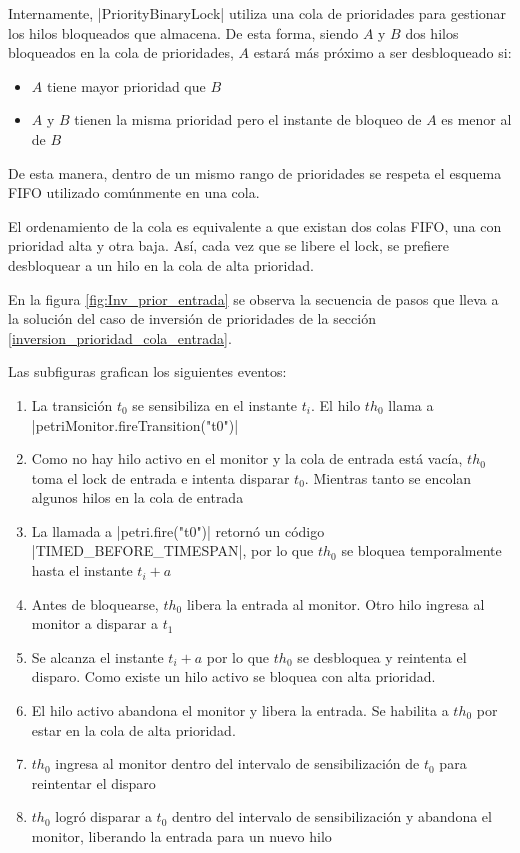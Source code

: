 Internamente, |PriorityBinaryLock| utiliza una cola de prioridades
para gestionar los hilos bloqueados que almacena. De esta forma, siendo $A$ y $B$
dos hilos bloqueados en la cola de prioridades, $A$ estará más próximo a ser
desbloqueado si:
\begin{itemize}
  \item $A$ tiene mayor prioridad que $B$
  \item $A$ y $B$ tienen la misma prioridad pero el instante de bloqueo de $A$
  es menor al de $B$
\end{itemize}

De esta manera, dentro de un mismo rango de prioridades se respeta el esquema
FIFO utilizado comúnmente en una cola.

El ordenamiento de la cola es equivalente a que existan dos colas FIFO, una con
prioridad alta y otra baja. Así, cada vez que se libere el lock, se prefiere
desbloquear a un hilo en la cola de alta prioridad.

En la figura \ref{fig:Inv_prior_entrada} se observa la secuencia de pasos que
lleva a la solución del caso de inversión de prioridades de la sección
\ref{inversion_prioridad_cola_entrada}.

Las subfiguras grafican los siguientes eventos:
\begin{enumerate}[label=\alph*)]
    \item La transición $t_{0}$ se sensibiliza en el instante $t_{i}$. El hilo
    $th_{0}$ llama a |petriMonitor.fireTransition("t0")|
    \item Como no hay hilo activo en el monitor y la cola de entrada está vacía,
    $th_{0}$ toma el lock de entrada e intenta disparar $t_{0}$. Mientras tanto
    se encolan algunos hilos en la cola de entrada
    \item La llamada a |petri.fire("t0")| retornó un código
    |TIMED_BEFORE_TIMESPAN|, por lo que $th_{0}$ se bloquea
    temporalmente hasta el instante $t_{i}+a$
    \item Antes de bloquearse, $th_{0}$ libera la entrada al monitor. Otro hilo
    ingresa al monitor a disparar a $t_{1}$
    \item Se alcanza el instante $t_{i}+a$ por lo que $th_{0}$ se desbloquea y
    reintenta el disparo. Como existe un hilo activo se bloquea con alta
    prioridad.
    \item El hilo activo abandona el monitor y libera la entrada. Se habilita a
    $th_{0}$ por estar en la cola de alta prioridad.
    \item $th_{0}$ ingresa al monitor dentro del intervalo de sensibilización de
    $t_{0}$ para reintentar el disparo
    \item $th_0$ logró disparar a $t_{0}$ dentro del intervalo de
    sensibilización y abandona el monitor, liberando la entrada para un nuevo
    hilo
\end{enumerate}

